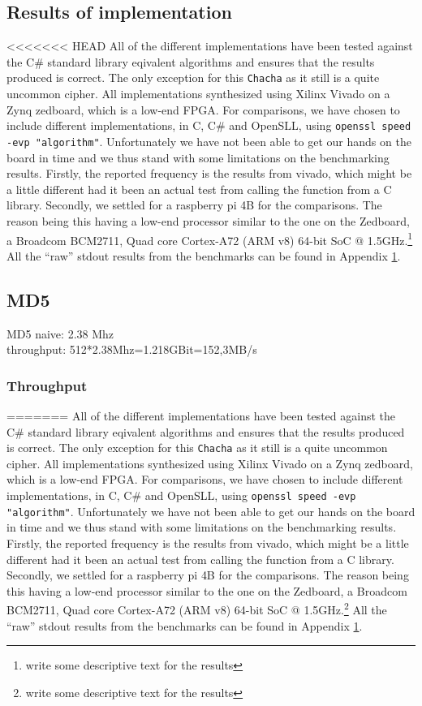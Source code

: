 \documentclass[a4paper]{article}
\begin{document}
\begin{enumerate}
\section{Results of implementation}
<<<<<<< HEAD
\label{sec:orgb0e6652}
All of the different implementations have been tested against the C\# standard library eqivalent algorithms and ensures that the results produced is correct. The only exception for this \texttt{Chacha} as it still is a quite uncommon cipher. All implementations synthesized using Xilinx Vivado on a Zynq zedboard, which is a low-end FPGA. For comparisons, we have chosen to include different implementations, in C, C\# and OpenSLL, using \texttt{openssl speed -evp "algorithm"}. Unfortunately we have not been able to get our hands on the board in time and we thus stand with some limitations on the benchmarking results. Firstly, the reported frequency is the results from vivado, which might be a little different had it been an actual test from calling the function from a C library.  Secondly, we settled for a raspberry pi 4B for the comparisons. The reason being this having a low-end processor similar to the one on the Zedboard, a Broadcom BCM2711, Quad core Cortex-A72 (ARM v8) 64-bit SoC @ 1.5GHz.\footnote{write some descriptive text for the results} All the ``raw'' stdout results from the benchmarks can be found in Appendix \ref{}.
\subsection{MD5}
\label{sec:orgde99956}
MD5 naive: 2.38 Mhz\\
throughput: 512*2.38Mhz=1.218GBit=152,3MB/s
\subsubsection{Throughput}
\label{sec:orgdd2ddd5}
=======
\label{sec:orgedc205f}
All of the different implementations have been tested against the C\# standard library eqivalent algorithms and ensures that the results produced is correct. The only exception for this \texttt{Chacha} as it still is a quite uncommon cipher. All implementations synthesized using Xilinx Vivado on a Zynq zedboard, which is a low-end FPGA. For comparisons, we have chosen to include different implementations, in C, C\# and OpenSLL, using \texttt{openssl speed -evp "algorithm"}. Unfortunately we have not been able to get our hands on the board in time and we thus stand with some limitations on the benchmarking results. Firstly, the reported frequency is the results from vivado, which might be a little different had it been an actual test from calling the function from a C library.  Secondly, we settled for a raspberry pi 4B for the comparisons. The reason being this having a low-end processor similar to the one on the Zedboard, a Broadcom BCM2711, Quad core Cortex-A72 (ARM v8) 64-bit SoC @ 1.5GHz.\footnote{write some descriptive text for the results} All the ``raw'' stdout results from the benchmarks can be found in Appendix \ref{}.

\end{enumerate}
\end{document}

